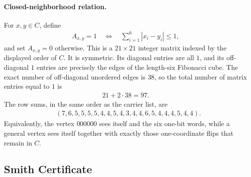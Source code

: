 \paragraph{Closed-neighborhood relation.} For $x,y\in C$, define
$$\begin{aligned}
A_{x,y}=1 \quad\Longleftrightarrow\quad \sum_{i=1}^6 |x_i-y_i|\le 1,
\end{aligned}$$
and set $A_{x,y}=0$ otherwise. This is a $21\times 21$ integer matrix indexed by the displayed order of $C$. It is symmetric. Its diagonal entries are all $1$, and its off-diagonal $1$ entries are precisely the edges of the length-six Fibonacci cube. The exact number of off-diagonal unordered edges is $38$, so the total number of matrix entries equal to $1$ is
$$\begin{aligned}
21+2\cdot 38=97.
\end{aligned}$$
The row sums, in the same order as the carrier list, are
$$\begin{aligned}
&(7,6,5,5,5,5,4,4,5,4,3,4,4,6,5,4,4,4,5,4,4).
\end{aligned}$$
Equivalently, the vertex $000000$ sees itself and the six one-bit words, while a general vertex sees itself together with exactly those one-coordinate flips that remain in $C$.

\subsection{Smith Certificate}\label{sec:window6-fibonacci-cube-smith-certificate}


